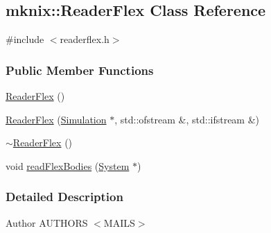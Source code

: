 \hypertarget{classmknix_1_1_reader_flex}{\subsection{mknix\-:\-:Reader\-Flex Class Reference}
\label{classmknix_1_1_reader_flex}
}


{\ttfamily \#include $<$readerflex.\-h$>$}

\subsubsection*{Public Member Functions}
\begin{DoxyCompactItemize}
\item 
\hyperlink{classmknix_1_1_reader_flex_a40cc48bec92653e2d324efad44d6d90c}{Reader\-Flex} ()
\item 
\hyperlink{classmknix_1_1_reader_flex_a0e217089057c1dd16af8199ba4eaf8fa}{Reader\-Flex} (\hyperlink{classmknix_1_1_simulation}{Simulation} $\ast$, std\-::ofstream \&, std\-::ifstream \&)
\item 
\hyperlink{classmknix_1_1_reader_flex_a41c26a0eff85dc4093f38ec7cbf44bfe}{$\sim$\-Reader\-Flex} ()
\item 
void \hyperlink{classmknix_1_1_reader_flex_a17e40160fd77f0f80209224c0d5c5cd9}{read\-Flex\-Bodies} (\hyperlink{classmknix_1_1_system}{System} $\ast$)
\end{DoxyCompactItemize}


\subsubsection{Detailed Description}
\begin{DoxyAuthor}{Author}
A\-U\-T\-H\-O\-R\-S $<$\-M\-A\-I\-L\-S$>$ 
\end{DoxyAuthor}


